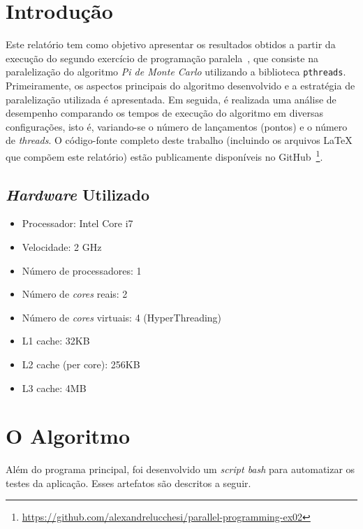 \documentclass[12pt,a4paper]{article}
\begin{document}


\section{Introdução}
Este relatório tem como objetivo apresentar os resultados obtidos a partir da
execução do segundo exercício de programação paralela~\cite{exercise}, que
consiste na paralelização do algoritmo \emph{Pi de Monte Carlo} utilizando a
biblioteca \texttt{pthreads}. Primeiramente, os aspectos principais do
algoritmo desenvolvido e a estratégia de paralelização utilizada é apresentada.
Em seguida, é realizada uma análise de desempenho comparando os tempos de
execução do algoritmo em diversas configurações, isto é, variando-se o número
de lançamentos (pontos) e o número de \textit{threads}.  O código-fonte
completo deste trabalho (incluindo os arquivos \LaTeX\xspace que compõem este
relatório) estão publicamente disponíveis no
GitHub~\footnote{\url{https://github.com/alexandrelucchesi/parallel-programming-ex02}}.

\subsection{\textit{Hardware} Utilizado}
\label{sec:hardware}

\begin{itemize}
    \item Processador: Intel Core i7
    \item Velocidade: 2 GHz
    \item Número de processadores: 1
    \item Número de \textit{cores} reais: 2
    \item Número de \textit{cores} virtuais: 4 (HyperThreading)
    \item L1 cache: 32KB
    \item L2 cache (per core): 256KB
    \item L3 cache: 4MB
\end{itemize}


\section{O Algoritmo}
Além do programa principal, foi desenvolvido um \textit{script bash} para
automatizar os testes da aplicação. Esses artefatos são descritos a seguir.
\end{document}
